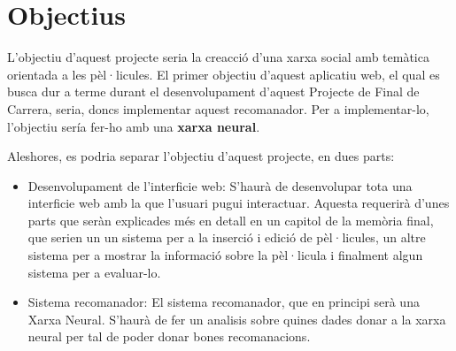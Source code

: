\chapter{Objectius}

L'objectiu d'aquest projecte seria la creacció d'una xarxa social amb temàtica orientada a les pèl·licules. El primer objectiu d'aquest aplicatiu web, el qual es busca dur a terme durant el desenvolupament d'aquest Projecte de Final de Carrera, seria, doncs implementar aquest recomanador. Per a implementar-lo, l'objectiu sería fer-ho amb una {\bf xarxa neural}.

Aleshores, es podria separar l'objectiu d'aquest projecte, en dues parts:

\begin{itemize}
\item Desenvolupament de l'interficie web: S'haurà de desenvolupar tota una interficie web amb la que l'usuari pugui interactuar. Aquesta requerirà d'unes parts que seràn explicades més en detall en un capitol de la memòria final, que serien un un sistema per a la inserció i edició de pèl·licules, un altre sistema per a mostrar la informació sobre la pèl·licula i finalment algun sistema per a evaluar-lo.
\item Sistema recomanador: El sistema recomanador, que en principi serà una Xarxa Neural. S'haurà de fer un analisis sobre quines dades donar a la xarxa neural per tal de poder donar bones recomanacions.
\end{itemize}
